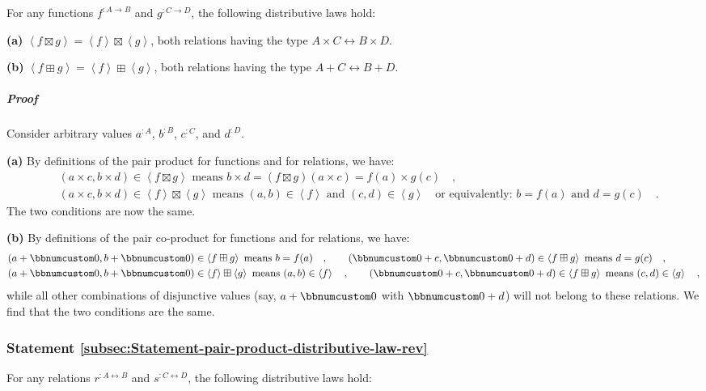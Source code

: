 For any functions $f^{:A\rightarrow B}$ and $g^{:C\rightarrow D}$,
the following distributive laws hold:

\textbf{(a)} $\left<f\boxtimes g\right>=\left<f\right>\boxtimes\left<g\right>$,
both relations having the type $A\times C\leftrightarrow B\times D$.

\textbf{(b)} $\left<f\boxplus g\right>=\left<f\right>\boxplus\left<g\right>$,
both relations having the type $A+C\leftrightarrow B+D$.

\subparagraph{Proof}

Consider arbitrary values $a^{:A}$, $b^{:B}$, $c^{:C}$, and $d^{:D}$.

\textbf{(a)} By definitions of the pair product for functions and
for relations, we have:
\begin{align*}
 & (a\times c,b\times d)\in\left<f\boxtimes g\right>\text{ means }b\times d=(f\boxtimes g)(a\times c)=f(a)\times g(c)\quad,\\
 & (a\times c,b\times d)\in\left<f\right>\boxtimes\left<g\right>\text{ means }(a,b)\in\left<f\right>\text{ and }(c,d)\in\left<g\right>\quad\text{or equivalently}:\,b=f(a)\text{ and }d=g(c)\quad.
\end{align*}
The two conditions are now the same.

\textbf{(b)} By definitions of the pair co-product for functions and
for relations, we have:
\begin{align*}
 & (a+\bbnum 0,b+\bbnum 0)\in\left<f\boxplus g\right>\text{ means }b=f(a)\quad,\quad\quad(\bbnum 0+c,\bbnum 0+d)\in\left<f\boxplus g\right>\text{ means }d=g(c)\quad,\\
 & (a+\bbnum 0,b+\bbnum 0)\in\left<f\right>\boxplus\left<g\right>\text{ means }(a,b)\in\left<f\right>\quad,\quad\quad(\bbnum 0+c,\bbnum 0+d)\in\left<f\boxplus g\right>\text{ means }(c,d)\in\left<g\right>\quad,
\end{align*}
while all other combinations of disjunctive values (say, $a+\bbnum 0$
with $\bbnum 0+d$) will not belong to these relations. We find that
the two conditions are the same.

\subsubsection{Statement \label{subsec:Statement-pair-product-distributive-law-rev}\ref{subsec:Statement-pair-product-distributive-law-rev}}

For any relations $r^{:A\leftrightarrow B}$ and $s^{:C\leftrightarrow D}$,
the following distributive laws hold:

